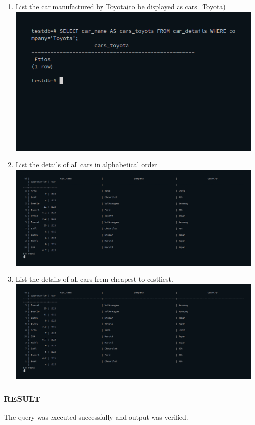 \documentclass[10pt,a4paper,titlepage]{report}
\begin{document}
{\begin{enumerate}
\item List the car manufactured by Toyota(to be displayed as cars\_Toyota)\newline
		\includegraphics[width=\linewidth]{../Images/Basics/22.png}\newline
	\item List the details of all cars in alphabetical order\newline
		\includegraphics[width=\linewidth]{../Images/Basics/23.png}\newline
	\item List the details of all cars from cheapest to costliest.\newline
		\includegraphics[width=\linewidth]{../Images/Basics/24.png}\newline
\end{enumerate}

\subsubsection{RESULT}

The query was executed successfully and output was verified.

}
\end{document}
